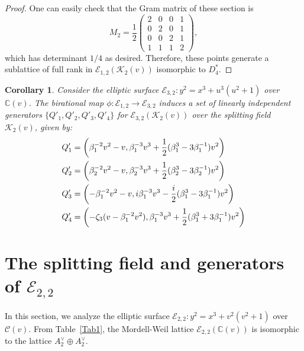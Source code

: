 \documentclass[11pt]{amsart}
\newcommand{\CC}{{\mathbb C}}
\newcommand{\Ee}{{\mathcal E}}
\newtheorem{cor}[thm]{Corollary}
\numberwithin{equation}{section}
\numberwithin{table}{section}
\newcommand\<{\langle}
\begin{document}
\begin{proof}
	One can easily check that the Gram matrix of  these section is 
\begin{equation}\label{ma4}
	M_2=\frac{1}{2}
	\begin{pmatrix}
	2 & 0 & 0 & 1 
	\\
	0 & 2 & 0 & 1 
	\\
	0 & 0 & 2 & 1 
	\\
	1 & 1 &1 & 2 	
	\end{pmatrix},
\end{equation}
which has determinant $1/4$ as desired.	
	Therefore, these points generate a sublattice of full rank in $\Ee_{1,2}(\mathcal{K}_2(v))$ isomorphic to $D_4^*$.	
\end{proof}

\begin{cor} 
	Consider the elliptic surface $\Ee_{3,2}: y^2 = x^3 + u^3(u^2+1)$ over $\mathbb{C}(v)$.
	The birational map $\phi: \Ee_{1,2} \rightarrow \Ee_{3,2}$  induces a set of linearly independent generators $\{Q'_1, Q'_2, Q'_3, Q'_4\}$ for $\Ee_{3,2}(\mathcal{K}_2(v))$ over the splitting field $\mathcal{K}_2(v)$, given by:
\begin{align}
	Q'_1 &= \left( \beta_1^{-2}v^2 - v,   \beta_1^{-3}v^3 + \frac{1}{2}(\beta_1^3 - 3\beta_1^{-1})v^2 \right) \notag \\
	Q'_2 &= \left( \beta_2^{-2}v^2 - v,  \beta_2^{-3}v^3 + \frac{1}{2}(\beta_2^3 - 3\beta_2^{-1})v^2 \right) \notag \\
		Q'_3 &= \left( -\beta_1^{-2}v^2 - v,   i\beta_1^{-3}v^3 - \frac{i}{2}(\beta_1^3 - 3\beta_1^{-1})v^2 \right) \notag \\
	Q'_4 &= \left( - \zeta_3 (v-\beta_1^{-2}v^2 ),   \beta_1^{-3}v^3 + \frac{1}{2}( \beta_1^3 + 3\beta_1^{-1})v^2 \right) \label{Q-(3,2)}
\end{align}
\end{cor}







\section{The splitting field and generators of $\Ee_{2,2}$}
\label{A2+A2-(2,2)}

In this section, we analyze the elliptic surface   $\mathcal{E}_{2,2}: y^2 = x^3 + v^2(v^2+1)$ over $\mathcal{C}(v)$. From Table~\ref{Tab1}, the Mordell-Weil lattice  $\Ee_{2,2} (\CC(v))$ is isomorphic to the lattice $A_2^\vee \oplus A_2^\vee$.
\end{document}

